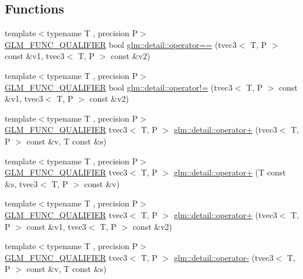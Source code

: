 \subsection*{Functions}
\begin{DoxyCompactItemize}
\item 
{\footnotesize template$<$typename T , precision P$>$ }\\\hyperlink{setup_8hpp_a33fdea6f91c5f834105f7415e2a64407}{G\+L\+M\+\_\+\+F\+U\+N\+C\+\_\+\+Q\+U\+A\+L\+I\+F\+I\+ER} bool \hyperlink{namespaceglm_1_1detail_a6ca031bf151ccbe45fd1ac847398f9b1}{glm\+::detail\+::operator==} (tvec3$<$ T, P $>$ const \&v1, tvec3$<$ T, P $>$ const \&v2)
\item 
{\footnotesize template$<$typename T , precision P$>$ }\\\hyperlink{setup_8hpp_a33fdea6f91c5f834105f7415e2a64407}{G\+L\+M\+\_\+\+F\+U\+N\+C\+\_\+\+Q\+U\+A\+L\+I\+F\+I\+ER} bool \hyperlink{namespaceglm_1_1detail_a5244a6f94d23d1ae6d1929ecf0f10010}{glm\+::detail\+::operator!=} (tvec3$<$ T, P $>$ const \&v1, tvec3$<$ T, P $>$ const \&v2)
\item 
{\footnotesize template$<$typename T , precision P$>$ }\\\hyperlink{setup_8hpp_a33fdea6f91c5f834105f7415e2a64407}{G\+L\+M\+\_\+\+F\+U\+N\+C\+\_\+\+Q\+U\+A\+L\+I\+F\+I\+ER} tvec3$<$ T, P $>$ \hyperlink{namespaceglm_1_1detail_aedb627c46d5c0bb9b05861f8e8e2af21}{glm\+::detail\+::operator+} (tvec3$<$ T, P $>$ const \&v, T const \&s)
\item 
{\footnotesize template$<$typename T , precision P$>$ }\\\hyperlink{setup_8hpp_a33fdea6f91c5f834105f7415e2a64407}{G\+L\+M\+\_\+\+F\+U\+N\+C\+\_\+\+Q\+U\+A\+L\+I\+F\+I\+ER} tvec3$<$ T, P $>$ \hyperlink{namespaceglm_1_1detail_ac036bf202b8c42d6a62204b66f822e35}{glm\+::detail\+::operator+} (T const \&s, tvec3$<$ T, P $>$ const \&v)
\item 
{\footnotesize template$<$typename T , precision P$>$ }\\\hyperlink{setup_8hpp_a33fdea6f91c5f834105f7415e2a64407}{G\+L\+M\+\_\+\+F\+U\+N\+C\+\_\+\+Q\+U\+A\+L\+I\+F\+I\+ER} tvec3$<$ T, P $>$ \hyperlink{namespaceglm_1_1detail_adab335b6f0036cb685853c9bb38e1ffe}{glm\+::detail\+::operator+} (tvec3$<$ T, P $>$ const \&v1, tvec3$<$ T, P $>$ const \&v2)
\item 
{\footnotesize template$<$typename T , precision P$>$ }\\\hyperlink{setup_8hpp_a33fdea6f91c5f834105f7415e2a64407}{G\+L\+M\+\_\+\+F\+U\+N\+C\+\_\+\+Q\+U\+A\+L\+I\+F\+I\+ER} tvec3$<$ T, P $>$ \hyperlink{namespaceglm_1_1detail_a1519c1361f86bd9d4a388e6962e77df1}{glm\+::detail\+::operator-\/} (tvec3$<$ T, P $>$ const \&v, T const \&s)

\end{DoxyCompactItemize}
